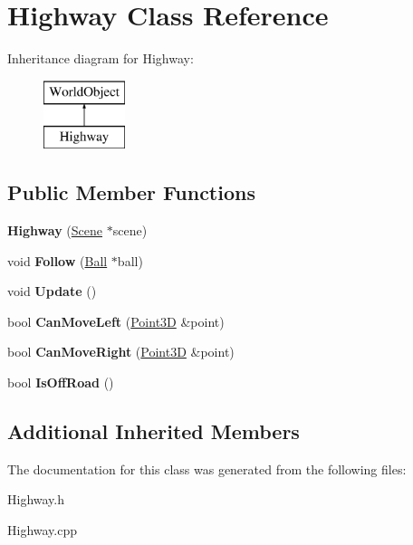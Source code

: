 \hypertarget{class_highway}{\section{Highway Class Reference}
\label{class_highway}
}
Inheritance diagram for Highway\+:\begin{figure}[H]
\begin{center}
\leavevmode
\includegraphics[height=2.000000cm]{class_highway}
\end{center}
\end{figure}
\subsection*{Public Member Functions}
\begin{DoxyCompactItemize}
\item 
\hypertarget{class_highway_abcdc42e3d3d0131e20857de0428ebe57}{{\bfseries Highway} (\hyperlink{class_scene}{Scene} $\ast$scene)}\label{class_highway_abcdc42e3d3d0131e20857de0428ebe57}

\item 
\hypertarget{class_highway_a04fe3235ee2707ad5c9043c38983a720}{void {\bfseries Follow} (\hyperlink{class_ball}{Ball} $\ast$ball)}\label{class_highway_a04fe3235ee2707ad5c9043c38983a720}

\item 
\hypertarget{class_highway_a71284d072685662c59591f804248dc89}{void {\bfseries Update} ()}\label{class_highway_a71284d072685662c59591f804248dc89}

\item 
\hypertarget{class_highway_a1a6e351d6c701e823052f69d233fb4de}{bool {\bfseries Can\+Move\+Left} (\hyperlink{struct_point3_d}{Point3\+D} \&point)}\label{class_highway_a1a6e351d6c701e823052f69d233fb4de}

\item 
\hypertarget{class_highway_a94e2179430243fef55e8459f891326ac}{bool {\bfseries Can\+Move\+Right} (\hyperlink{struct_point3_d}{Point3\+D} \&point)}\label{class_highway_a94e2179430243fef55e8459f891326ac}

\item 
\hypertarget{class_highway_a826881d3a7e1332f7d16deb5b7f998dd}{bool {\bfseries Is\+Off\+Road} ()}\label{class_highway_a826881d3a7e1332f7d16deb5b7f998dd}

\end{DoxyCompactItemize}
\subsection*{Additional Inherited Members}


The documentation for this class was generated from the following files\+:\begin{DoxyCompactItemize}
\item 
Highway.\+h\item 
Highway.\+cpp\end{DoxyCompactItemize}
